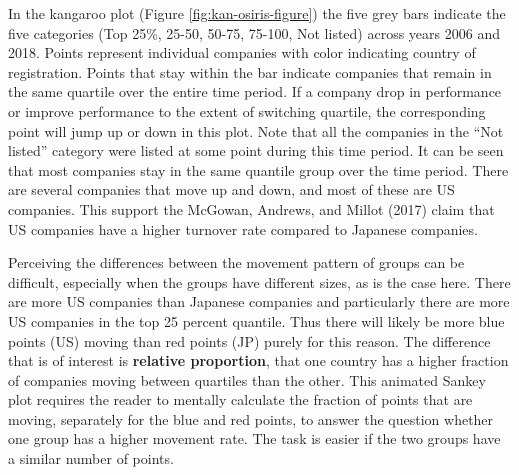 In the kangaroo plot (Figure \ref{fig:kan-osiris-figure}) the five grey bars indicate the five categories (Top 25\%, 25-50, 50-75, 75-100, Not listed) across years 2006 and 2018. Points represent individual companies with color indicating country of registration. Points that stay within the bar indicate companies that remain in the same quartile over the entire time period. If a company drop in performance or improve performance to the extent of switching quartile, the corresponding point will jump up or down in this plot. Note that all the companies in the ``Not listed'' category were listed at some point during this time period. It can be seen that most companies stay in the same quantile group over the time period. There are several companies that move up and down, and most of these are US companies. This support the McGowan, Andrews, and Millot (2017) claim that US companies have a higher turnover rate compared to Japanese companies.

Perceiving the differences between the movement pattern of groups can be difficult, especially when the groups have different sizes, as is the case here. There are more US companies than Japanese companies and particularly there are more US companies in the top 25 percent quantile. Thus there will likely be more blue points (US) moving than red points (JP) purely for this reason. The difference that is of interest is \textbf{relative proportion}, that one country has a higher fraction of companies moving between quartiles than the other. This animated Sankey plot requires the reader to mentally calculate the fraction of points that are moving, separately for the blue and red points, to answer the question whether one group has a higher movement rate. The task is easier if the two groups have a similar number of points.

